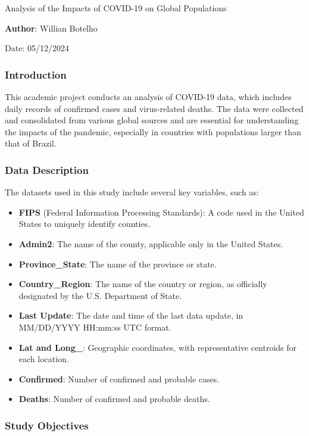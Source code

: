 \documentclass[
]{article}
\author{}
\date{\vspace{-2.5em}}
\providecommand{\tightlist}{%
  \setlength{\itemsep}{0pt}\setlength{\parskip}{0pt}}
\begin{document}
Analysis of the Impacts of COVID-19 on Global Populations

\textbf{Author}: Willian Botelho

Date: 05/12/2024

\subsubsection{Introduction}\label{introduction}

This academic project conducts an analysis of COVID-19 data, which
includes daily records of confirmed cases and virus-related deaths. The
data were collected and consolidated from various global sources and are
essential for understanding the impacts of the pandemic, especially in
countries with populations larger than that of Brazil.

\subsubsection{Data Description}\label{data-description}

The datasets used in this study include several key variables, such as:

\begin{itemize}
\tightlist
\item
  \textbf{FIPS} (Federal Information Processing Standards): A code used
  in the United States to uniquely identify counties.
\item
  \textbf{Admin2}: The name of the county, applicable only in the United
  States.
\item
  \textbf{Province\_State}: The name of the province or state.
\item
  \textbf{Country\_Region}: The name of the country or region, as
  officially designated by the U.S. Department of State.
\item
  \textbf{Last Update}: The date and time of the last data update, in
  MM/DD/YYYY HH:mm:ss UTC format.
\item
  \textbf{Lat and Long\_}: Geographic coordinates, with representative
  centroids for each location.
\item
  \textbf{Confirmed}: Number of confirmed and probable cases.
\item
  \textbf{Deaths}: Number of confirmed and probable deaths.
\end{itemize}

\subsubsection{Study Objectives}\label{study-objectives}
\end{document}
